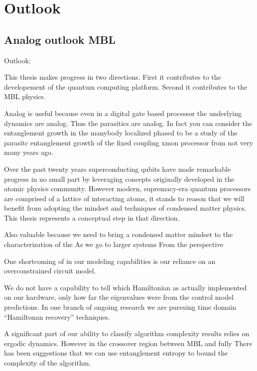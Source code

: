 \chapter[Outlook]{Outlook}

\section{Analog outlook MBL}

Outlook:

This thesis makes progress in two directions.  First it contributes to the developement of the quantum computing platform.  Second it contributes to the MBL physics.

Analog is useful because even in a digital gate based processor the underlying dynamics are analog.  Thus the parasitics are analog.  In fact you can consider the entanglement growth in the manybody localized phased to be a study of the parasitc entanglement growth of the fixed coupling xmon processor from not very many years ago.

Over the past twenty years superconducting qubits have made remarkable progress in no small part by leveraging concepts originally developed in the atomic physics community.  However modern, supremacy-era quantum processors are comprised of a lattice of interacting atoms, it stands to reason that we will benefit from adopting the mindset and techniques of condensed matter physics.  This thesis represents a conceptual step in that direction.

Also valuable because we need to bring a condensed matter mindset to the characterization of the  As we go to larger systems
From the perspective

One shortcoming of in our modeling capabilities is our reliance on an overconstrained circuit model.

We do not have a capability to tell which Hamiltonian as actually implemented on our hardware, only how far the eigenvalues were from the control model predictions.  In one branch of ongoing research we are pursuing time domain “Hamiltonan recovery” techniques.

A significant part of our ability to classify algorithm complexity results relies on ergodic dynamics.  However in the crossover region between MBL and fully
There has been suggestions that we can use entanglement entropy to bound the complexity of the algorithm.

